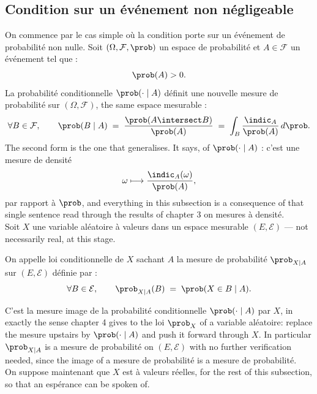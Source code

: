 \subsection{Condition sur un événement non négligeable}

On commence par le cas simple où la condition porte sur un événement de
probabilité non nulle. Soit $(\Omega,\mathcal{F},\prob)$ un espace de probabilité et
$A \in \mathcal{F}$ un événement tel que :
\[
  \prob(A) > 0 .
\]
La probabilité conditionnelle $\prob(\cdot \mid A)$ définit une nouvelle mesure de
probabilité sur $(\Omega,\mathcal{F})$, the same espace mesurable :
\[
  \forall B \in \mathcal{F}, \qquad
  \prob(B \mid A) \;=\; \frac{\prob(A \intersect B)}{\prob(A)}
  \;=\; \int_{B} \frac{\indic_{A}}{\prob(A)} \, d\prob .
\]
The second form is the one that generalises. It says, of
$\prob(\cdot \mid A)$ : c'est une mesure de densité
\begin{equation*}
  \omega \longmapsto \frac{\indic_{A}(\omega)}{\prob(A)} ,
\end{equation*}
par rapport à $\prob$, and everything in this subsection is a consequence of that
single sentence read through the results of chapter 3 on mesures à densité.\\

Soit $X$ une variable aléatoire à valeurs dans un espace mesurable
$(E,\mathcal{E})$ --- not necessarily real, at this stage.

\begin{definition}
  On appelle loi conditionnelle de $X$ sachant $A$ la mesure de probabilité
  $\prob_{X \mid A}$ sur $(E,\mathcal{E})$ définie par :
  \[
    \forall B \in \mathcal{E}, \qquad
    \prob_{X \mid A}(B) \;=\; \prob(X \in B \mid A) .
  \]
\end{definition}

C'est la mesure image de la probabilité conditionnelle
$\prob(\cdot \mid A)$ par $X$, in exactly the sense chapter 4 gives to the loi
$\prob_{X}$ of a variable aléatoire: replace the mesure upstairs by
$\prob(\cdot \mid A)$ and push it forward through $X$. In particular
$\prob_{X \mid A}$ is a mesure de probabilité on $(E,\mathcal{E})$ with no further
verification needed, since the image of a mesure de probabilité is a mesure de
probabilité.\\

On suppose maintenant que $X$ est à valeurs réelles, for the rest of this
subsection, so that an espérance can be spoken of.

